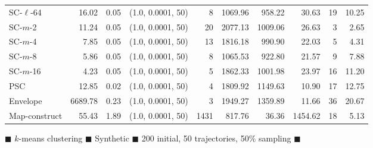 \documentclass[11pt]{article}
\begin{document}
\begin{figure}
\begin{center}
\begin{minipage}{\textwidth}
{\begin{tabular}{@{}lrrcrrrrrr@{}}
        SC-$\ell$-64 & 16.02 & 0.05 & (1.0, 0.0001, 50) & 8 & 1069.96 & 958.22 & 30.63 & 19 & 10.25\\
        SC-$m$-2 & 11.24 & 0.05 & (1.0, 0.0001, 50) & 20 & 2077.13 & 1009.06 & 26.63 & 3 & 2.65\\
        SC-$m$-4 & 7.85 & 0.05 & (1.0, 0.0001, 50) & 13 & 1816.18 & 990.90 & 22.03 & 5 & 4.31\\
        SC-$m$-8 & 5.86 & 0.05 & (1.0, 0.0001, 50) & 8 & 1065.53 & 922.80 & 21.57 & 9 & 7.88\\
        SC-$m$-16 & 4.23 & 0.05 & (1.0, 0.0001, 50) & 5 & 1862.33 & 1001.98 & 23.97 & 16 & 11.20\\
        PSC & 12.85 & 0.02 & (1.0, 0.0001, 50) & 4 & 1809.92 & 1149.63 & 10.90 & 17 & 12.75\\
        Envelope & 6689.78 & 0.23 & (1.0, 0.0001, 50) & 3 & 1949.27 & 1359.89 & 11.66 & 36 & 20.67\\
        Map-construct & 55.43 & 1.89 & (1.0, 0.0001, 50) & 1431 & 817.76 & 36.36 & 1454.62 & 18 & 5.13\\
        \bottomrule
    \end{tabular}
    }
  \end{minipage}
  \end{center}
        \caption{
        $\blacksquare$ $k$-means clustering $\blacksquare$ Synthetic $\blacksquare$ 200 initial, 50 trajectories, 50\% sampling $\blacksquare$}
 \end{figure}
\clearpage
\newpage 
%
\clearpage
\end{document}
